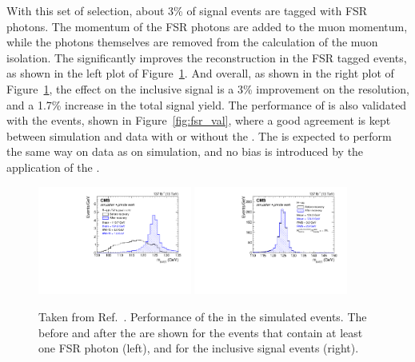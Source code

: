 With this set of selection, about 3\% of signal events are tagged with FSR photons.
The momentum of the FSR photons are added to the muon momentum, 
while the photons themselves are removed from the calculation of the muon isolation.
The \FSR significantly improves the \mmm reconstruction in the FSR tagged events, as shown in the left plot of Figure~\ref{fig:fsr_sig}.
And overall, as shown in the right plot of Figure~\ref{fig:fsr_sig}, the effect on the inclusive signal is a 3\% improvement on the \mmm resolution, 
and a 1.7\% increase in the total signal yield. 
The performance of \FSR is also validated with the \zmm events, shown in Figure~\ref{fig:fsr_val},
where a good agreement is kept between simulation and data with or without the \FSR. 
The \FSR is expected to perform the same way on data as on simulation, 
and no bias is introduced by the application of the \FSR. 

\begin{figure}[!htb]
      \centering
      \captionsetup{justification=justified}
      \includegraphics[width=0.45\textwidth]{pics/muon_corr/FSR/FSRrecovery_FSRtagged.pdf}
      \includegraphics[width=0.45\textwidth]{pics/muon_corr/FSR/FSRrecovery_FullSignal.pdf}
      \caption{Taken from Ref.~\cite{oliverthesis}. 
               Performance of the \FSR in the simulated \hmm events. 
               The \mmm before and after the \FSR are shown for the events that contain at least one FSR photon (left),
               and for the inclusive signal events (right).}
      \label{fig:fsr_sig}
\end{figure}


